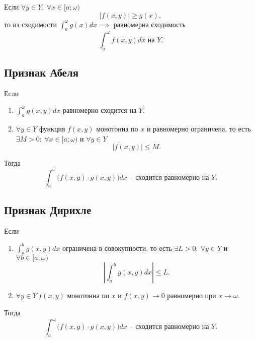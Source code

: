 \begin{corollary}
    Если $\forall y \in Y, \ \forall x \in [a;\omega)$
    \[
        \big|f(x,y)\big| \geqslant g(x),
    \]
    то из сходимости $\int_{a}^{\omega}g(x)dx \implies$ равномерна сходимость
    \[
        \int_{a}^{\omega}f(x,y)dx \text{ на }Y.
    \]
\end{corollary}

\subsection{Признак Абеля}

\begin{theorem}
    Если \begin{enumerate}
        \item $\int_{a}^{\omega}g(x,y)dx$ равномерно сходится на $Y$.
        \item $\forall y \in Y$ функция $f(x,y)$ монотонна по $x$ и равномерно ограничена, то есть $\exists M > 0: \ \forall x \in [a;\omega)$ и $\forall y \in Y$
              \[
                  \left|f(x,y)\right| \leqslant M.
              \]
    \end{enumerate}

    Тогда
    \[
        \int_{a}^{\omega}\big(f(x,y) \cdot g(x,y)\big)dx \text{ -- сходится равномерно на }Y.
    \]
\end{theorem}

\newpage

\subsection{Признак Дирихле}

\begin{theorem}
    Если
    \begin{enumerate}
        \item $\int_{a}^{b}g(x,y)dx$ ограничена в совокупности, то есть $\exists L > 0: \ \forall y \in Y$ и $\forall b \in [a;\omega)$
              \[
                  \left|\int_{a}^{b}g(x,y)dx\right| \leqslant L.
              \]
        \item $\forall y \in Y \ f(x,y)$ монотонна по $x$ и $f(x,y) \rightarrow 0$ равномерно при $x \rightarrow \omega$.
    \end{enumerate}

    Тогда
    \[
        \int_{a}^{\omega}\big(f(x,y)\cdot g(x,y)\big)dx \text{ -- сходится равномерно на } Y.
    \]
\end{theorem}